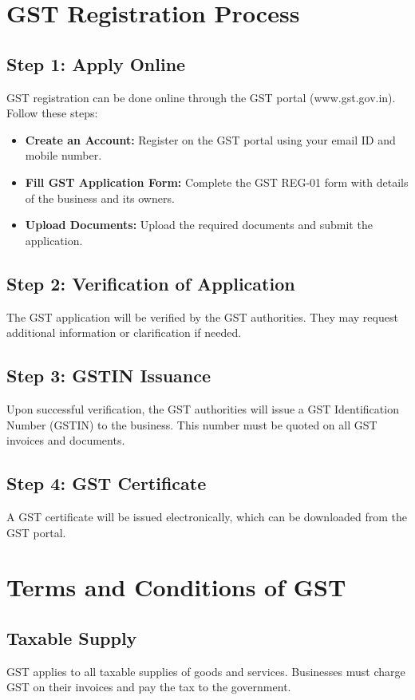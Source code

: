 \documentclass{article}
\begin{document}
\section{GST Registration Process}
\subsection{Step 1: Apply Online}
GST registration can be done online through the GST portal (www.gst.gov.in). Follow these steps:
\begin{itemize}
    \item \textbf{Create an Account:} Register on the GST portal using your email ID and mobile number.
    \item \textbf{Fill GST Application Form:} Complete the GST REG-01 form with details of the business and its owners.
    \item \textbf{Upload Documents:} Upload the required documents and submit the application.
\end{itemize}

\subsection{Step 2: Verification of Application}
The GST application will be verified by the GST authorities. They may request additional information or clarification if needed.

\subsection{Step 3: GSTIN Issuance}
Upon successful verification, the GST authorities will issue a GST Identification Number (GSTIN) to the business. This number must be quoted on all GST invoices and documents.

\subsection{Step 4: GST Certificate}
A GST certificate will be issued electronically, which can be downloaded from the GST portal.

\section{Terms and Conditions of GST}
\subsection{Taxable Supply}
GST applies to all taxable supplies of goods and services. Businesses must charge GST on their invoices and pay the tax to the government.
\end{document}
